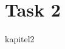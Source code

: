 \documentclass[class=report, crop=false]{standalone}
\begin{document}
\part{Task 2}
{kapitel2}
\end{document}
